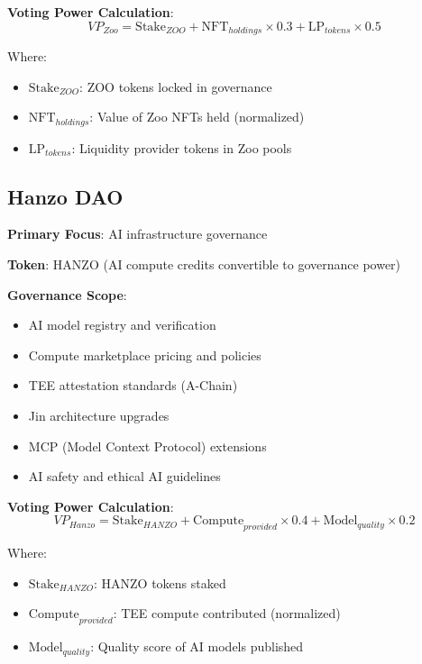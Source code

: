 \documentclass[11pt,a4paper]{article}
\begin{document}
\textbf{Voting Power Calculation}:
\begin{equation}
VP_{Zoo} = \text{Stake}_{ZOO} + \text{NFT}_{holdings} \times 0.3 + \text{LP}_{tokens} \times 0.5
\end{equation}

Where:
\begin{itemize}
\item $\text{Stake}_{ZOO}$: ZOO tokens locked in governance
\item $\text{NFT}_{holdings}$: Value of Zoo NFTs held (normalized)
\item $\text{LP}_{tokens}$: Liquidity provider tokens in Zoo pools
\end{itemize}

\subsection{Hanzo DAO}

\textbf{Primary Focus}: AI infrastructure governance

\textbf{Token}: HANZO (AI compute credits convertible to governance power)

\textbf{Governance Scope}:
\begin{itemize}
\item AI model registry and verification
\item Compute marketplace pricing and policies
\item TEE attestation standards (A-Chain)
\item Jin architecture upgrades
\item MCP (Model Context Protocol) extensions
\item AI safety and ethical AI guidelines
\end{itemize}

\textbf{Voting Power Calculation}:
\begin{equation}
VP_{Hanzo} = \text{Stake}_{HANZO} + \text{Compute}_{provided} \times 0.4 + \text{Model}_{quality} \times 0.2
\end{equation}

Where:
\begin{itemize}
\item $\text{Stake}_{HANZO}$: HANZO tokens staked
\item $\text{Compute}_{provided}$: TEE compute contributed (normalized)
\item $\text{Model}_{quality}$: Quality score of AI models published
\end{itemize}
\end{document}
